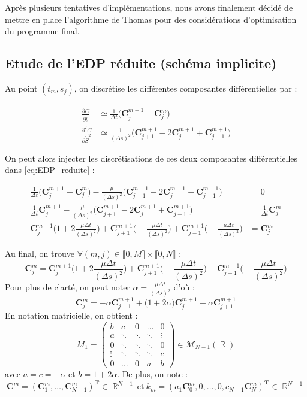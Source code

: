 \documentclass[11pt,a4paper]{article}
\newcommand{\deriv}[3][]{%
  \ensuremath{\frac{\partial^{#1} {#2}}{\partial {#3}^{#1}}}}
\newcommand*{\intval}[2]{\llbracket #1, #2 \rrbracket}
\newcommand*{\C}[2]{\mathbf{C}^{#1}_{#2}}
\theoremstyle{plain}
\DeclareMathOperator{\R}{\mathbb{R}}
\begin{document}
Après plusieurs tentatives d'implémentations, nous avons finalement décidé de mettre en place l'algorithme de Thomas pour des considérations d'optimisation du programme final.

\subsection{Etude de l'EDP réduite (schéma implicite)}

Au point $(t_m, s_j)$, on discrétise les différentes composantes différentielles par :

\begin{align*} 
\deriv{\widetilde{C}}{\widetilde{t}} &\simeq \frac{1}{\Delta t}\Big(\C{m + 1}{j} - \C{m}{j}\Big) \\ 
\deriv[2]{\widetilde{C}}{\widetilde{S}} &\simeq \frac{1}{(\Delta s)^2}\Big(\C{m + 1}{j + 1} - 2\C{m + 1}{j} + \C{m + 1}{j - 1}\Big)
\end{align*}

On peut alors injecter les discrétisations de ces deux composantes différentielles dans \eqref{eq:EDP_reduite} :

\begin{align*}
    \frac{1}{\Delta t}\Big(\C{m + 1}{j} - \C{m}{j}\Big) - \frac{\mu}{(\Delta s)^2}\Big(\C{m + 1}{j + 1} - 2\C{m + 1}{j} + \C{m + 1}{j - 1}\Big) &= 0 \\
    \frac{1}{\Delta t}\C{m + 1}{j} - \frac{\mu}{(\Delta s)^2}\Big(\C{m + 1}{j + 1} - 2\C{m + 1}{j} + \C{m + 1}{j - 1}\Big) &= \frac{1}{\Delta t}\C{m}{j} \\
    \C{m + 1}{j}\Big(1 + 2\frac{\mu\Delta t}{(\Delta s)^2}\Big) + \C{m + 1}{j + 1}\Big(-\frac{\mu\Delta t}{(\Delta s)^2}\Big) + \C{m + 1}{j - 1}\Big(-\frac{\mu\Delta t}{(\Delta s)^2}\Big)  &= \C{m}{j}
\end{align*}

Au final, on trouve $\forall (m, j) \in \intval{0}{M} \times \intval{0}{N}$ :
$$\boxed{\C{m}{j} = \C{m + 1}{j}\Big(1 + 2\frac{\mu\Delta t}{(\Delta s)^2}\Big) + \C{m + 1}{j + 1}\Big(-\frac{\mu\Delta t}{(\Delta s)^2}\Big) + \C{m + 1}{j - 1}\Big(-\frac{\mu\Delta t}{(\Delta s)^2}\Big)}
$$
Pour plus de clarté, on peut noter $\alpha = \frac{\mu\Delta t}{(\Delta s)^2}$ d'où :
$$\boxed{\C{m}{j} = - \alpha\C{m + 1}{j - 1} + \Big(1 + 2\alpha\Big)\C{m + 1}{j} - \alpha \C{m + 1}{j + 1}}
$$
En notation matricielle, on obtient :
$$
M_1 = 
\begin{pmatrix}
b & c & 0 & \dots & 0  \\
a & \ddots & \ddots  & \ddots & \vdots  \\
0 & \ddots &\ddots  &\ddots  & 0  \\
\vdots & \ddots & \ddots &\ddots  & c \\
0 & \dots  & 0  & a & b 
\end{pmatrix} \in \mathcal{M}_{N - 1}(\R)
$$
avec $a = c = -\alpha$ et $b = 1 + 2\alpha$. De plus, on note :
$$
\C{m}{} = (\C{m}{1}, \dots, \C{m}{N - 1})^{\textbf{T}} \in \R^{N - 1} \ \text{et} \
k_{m} = (a_1\C{m}{0}, 0, \dots, 0, c_{N - 1}\C{m}{N})^{\textbf{T}} \in \R^{N - 1}
$$
\end{document}
